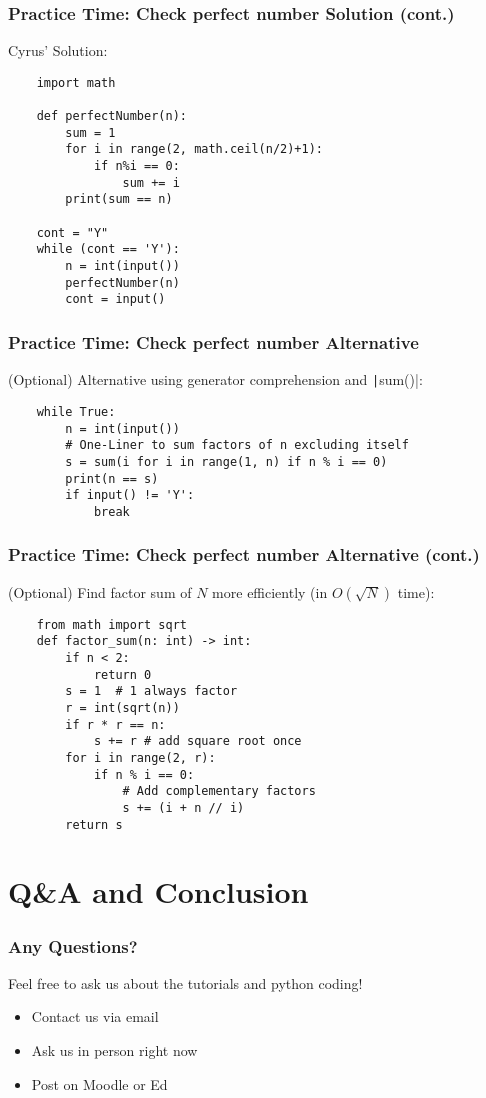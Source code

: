 \documentclass{beamer}
\begin{document}
\begin{frame}[fragile]
    \frametitle{Practice Time: Check perfect number Solution (cont.)}

    Cyrus' Solution:
    \begin{verbatim}
    import math

    def perfectNumber(n):
        sum = 1
        for i in range(2, math.ceil(n/2)+1):
            if n%i == 0:
                sum += i
        print(sum == n)

    cont = "Y"
    while (cont == 'Y'):
        n = int(input())
        perfectNumber(n)
        cont = input()
    \end{verbatim}
\end{frame}

\begin{frame}[fragile]
    \frametitle{Practice Time: Check perfect number Alternative}

    (Optional) Alternative using generator comprehension and \texttt|sum()|:
    \begin{verbatim}
    while True:
        n = int(input())
        # One-Liner to sum factors of n excluding itself
        s = sum(i for i in range(1, n) if n % i == 0)
        print(n == s)
        if input() != 'Y':
            break
    \end{verbatim}
\end{frame}

\begin{frame}[fragile]
    \frametitle{Practice Time: Check perfect number Alternative (cont.)}
    (Optional) Find factor sum of $N$ more efficiently (in $O(\sqrt{N})$ time):
    \begin{verbatim}
    from math import sqrt
    def factor_sum(n: int) -> int:
        if n < 2:
            return 0
        s = 1  # 1 always factor
        r = int(sqrt(n))
        if r * r == n:
            s += r # add square root once
        for i in range(2, r):
            if n % i == 0:
                # Add complementary factors
                s += (i + n // i)
        return s
    \end{verbatim}
\end{frame}

\section{Q\&A and Conclusion}
\begin{frame}
    \frametitle{Any Questions?}

    Feel free to ask us about the tutorials and python coding!

    \begin{itemize}
        \item Contact us via email
        \item Ask us in person right now
        \item Post on Moodle or Ed
    \end{itemize}
\end{frame}
\end{document}

